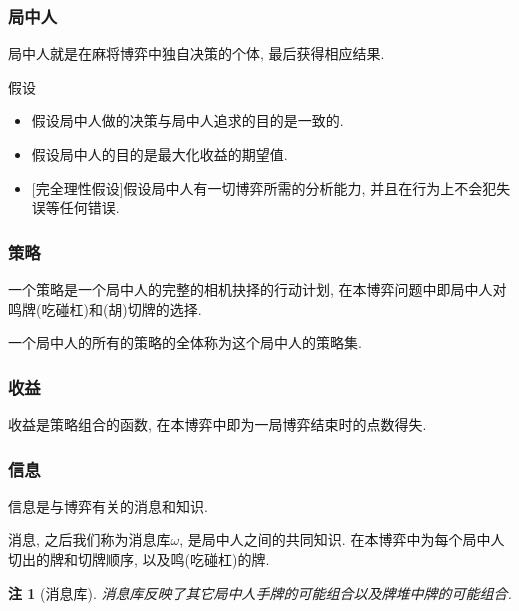\documentclass[xcolor=dvipsnames]{ctexbeamer}
\newtheorem{note}{注}[section]
\newcommand{\base}{\omega}
\begin{document}
    \begin{frame}
        \frametitle{局中人}
        \begin{definition}[局中人]
            局中人就是在麻将博弈中独自决策的个体, 最后获得相应结果.
        \end{definition}
        
        \begin{block}{假设}
            \begin{itemize}
                \item 假设局中人做的决策与局中人追求的目的是一致的.
                \item 假设局中人的目的是最大化收益的期望值.
                \item {[\alert{完全理性假设}]}假设局中人有一切博弈所需的分析能力,
                    并且在行为上不会犯失误等任何错误.
            \end{itemize}
        \end{block}
    \end{frame}

    \begin{frame}
        \frametitle{策略}
        \begin{definition}[策略]
            一个策略是一个局中人的完整的相机抉择的行动计划,
            在本博弈问题中即局中人对鸣牌(吃碰杠)和(胡)切牌的选择.
        \end{definition}
        \begin{definition}[策略集]
            一个局中人的所有的策略的全体称为这个局中人的策略集.
        \end{definition}
    \end{frame}

    \begin{frame}
        \frametitle{收益}
        \begin{definition}[收益]
            收益是策略组合的函数, 在本博弈中即为一局博弈结束时的点数得失.
        \end{definition}
    \end{frame}

    \begin{frame}
        \frametitle{信息}
        \begin{definition}[信息]
            信息是与博弈有关的消息和知识.
        \end{definition}
        \begin{definition}[消息]
            消息, 之后我们称为消息库$\base$, 是局中人之间的共同知识.
            在本博弈中为每个局中人切出的牌和切牌顺序, 以及鸣(吃碰杠)的牌.
        \end{definition}
        \begin{note}[消息库]
            消息库反映了其它局中人手牌的可能组合以及牌堆中牌的可能组合.
        \end{note}
    \end{frame}
\end{document}
